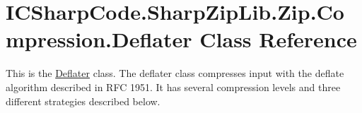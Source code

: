 \hypertarget{class_i_c_sharp_code_1_1_sharp_zip_lib_1_1_zip_1_1_compression_1_1_deflater}{}\section{I\+C\+Sharp\+Code.\+Sharp\+Zip\+Lib.\+Zip.\+Compression.\+Deflater Class Reference}
\label{class_i_c_sharp_code_1_1_sharp_zip_lib_1_1_zip_1_1_compression_1_1_deflater}


This is the \hyperlink{class_i_c_sharp_code_1_1_sharp_zip_lib_1_1_zip_1_1_compression_1_1_deflater}{Deflater} class. The deflater class compresses input with the deflate algorithm described in R\+FC 1951. It has several compression levels and three different strategies described below.  


